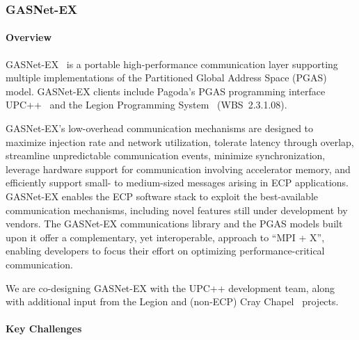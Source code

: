 \subsubsection{ GASNet-EX}\label{subsubsect:gasnet-ex}
\paragraph{Overview} 

GASNet-EX~\cite{gasnet-site} is a portable high-performance communication layer
supporting multiple implementations of the Partitioned Global Address Space
(PGAS) model.
GASNet-EX clients include Pagoda's PGAS programming interface UPC++~\cite{upcxx-ipdps19,upcxx-site}
 and the Legion Programming
System~\cite{bauer2012legion,legion-site} (WBS~2.3.1.08).

GASNet-EX's low-overhead communication mechanisms are designed to maximize
injection rate and network utilization, tolerate latency through
overlap, streamline unpredictable communication events, minimize
synchronization,
leverage hardware support for communication involving accelerator memory,
and efficiently support small- to medium-sized
messages arising in ECP applications.  GASNet-EX enables the ECP
software stack to exploit the best-available communication mechanisms,
including novel features still under development by vendors.  The
GASNet-EX communications library and the PGAS models built upon it
offer a complementary, yet interoperable, approach to ``MPI + X'',
enabling developers to focus their effort on optimizing
performance-critical communication.

We are co-designing GASNet-EX with the UPC++ development team,
along with additional input from the Legion and
(non-ECP) Cray Chapel~\cite{chapel-chapter,chapel-site} projects.

\paragraph{Key Challenges}

